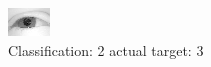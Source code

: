\begin{figure}[h!]
\begin{center}
\includegraphics[width=0.60\columnwidth]{figures/ID2393_class_2_target_3.png}
\end{center}
\caption{ Classification: 2 actual target: 3}
\label{fig:ID2393_class_2_target_3}
\end{figure}

